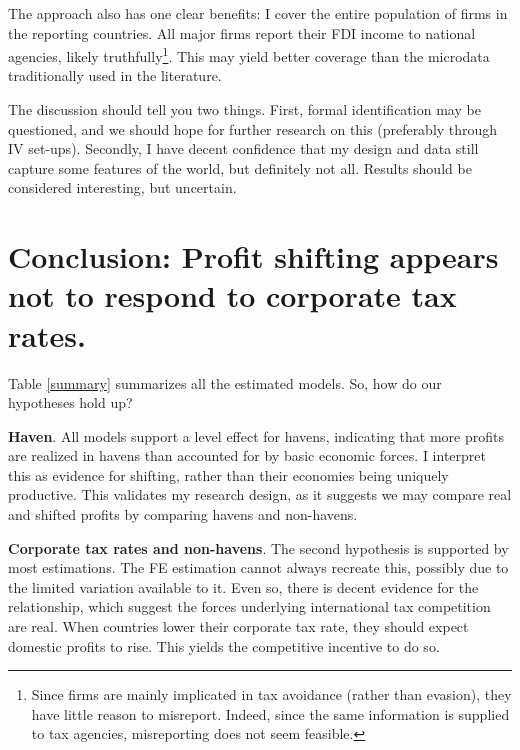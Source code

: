 \documentclass[twoside,a4paper,11pt]{article}
\begin{document}
The approach also has one clear benefits: I cover the entire population of firms in the reporting countries. All major firms report their FDI income to national agencies, likely truthfully\footnote{Since firms are mainly implicated in tax avoidance (rather than evasion), they have little reason to misreport. Indeed, since the same information is supplied to tax agencies, misreporting does not seem feasible.}.  This may yield better coverage than the microdata traditionally used in the literature.

The discussion should tell you two things. First, formal identification may be questioned, and we should hope for further research on this (preferably through IV set-ups). Secondly, I have decent confidence that my design and data still capture some features of the world, but definitely not all. Results should be considered interesting, but uncertain.  

\section{Conclusion: Profit shifting appears not to respond to corporate tax rates.}
Table \ref{summary} summarizes all the estimated models. So, how do our hypotheses hold up?

\textbf{Haven}. All models support a level effect for havens, indicating  that more profits are realized in havens than accounted for by basic economic forces. I interpret this as evidence for shifting, rather than their economies being uniquely productive. This validates my research design, as it suggests we may compare real and shifted profits by comparing havens and non-havens.

\textbf{Corporate tax rates and non-havens}. The second hypothesis is supported by most estimations. The FE estimation cannot always recreate this, possibly due to the limited variation available to it. Even so, there is decent evidence for the relationship, which suggest the forces underlying international tax competition are real. When countries lower their corporate tax rate, they should expect domestic profits  to rise. This yields the competitive incentive to do so.
\end{document}
